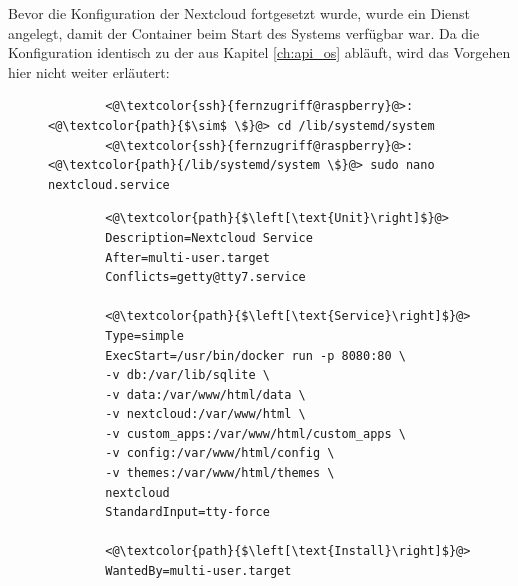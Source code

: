 \documentclass[a4paper, 11pt]{scrartcl}
\begin{document}
Bevor die Konfiguration der Nextcloud fortgesetzt wurde, wurde ein Dienst angelegt, damit der Container beim Start des Systems verfügbar war. Da die Konfiguration
identisch zu der aus Kapitel \ref{ch:api_os} abläuft, wird das Vorgehen hier nicht weiter erläutert:
\begin{figure}[H]
    \begin{mdframed}[backgroundcolor=bbg]
        \begin{lstlisting}
        <@\textcolor{ssh}{fernzugriff@raspberry}@>:<@\textcolor{path}{$\sim$ \$}@> cd /lib/systemd/system
        <@\textcolor{ssh}{fernzugriff@raspberry}@>:<@\textcolor{path}{/lib/systemd/system \$}@> sudo nano nextcloud.service
        \end{lstlisting}
    \end{mdframed}
    \label{lst:create_service_file_nextcloud}
\end{figure}

\begin{figure}[H]
    \begin{mdframed}[backgroundcolor=bbg]
        \begin{lstlisting}
        <@\textcolor{path}{$\left[\text{Unit}\right]$}@>
        Description=Nextcloud Service
        After=multi-user.target
        Conflicts=getty@tty7.service

        <@\textcolor{path}{$\left[\text{Service}\right]$}@>
        Type=simple
        ExecStart=/usr/bin/docker run -p 8080:80 \
        -v db:/var/lib/sqlite \
        -v data:/var/www/html/data \
        -v nextcloud:/var/www/html \
        -v custom_apps:/var/www/html/custom_apps \
        -v config:/var/www/html/config \
        -v themes:/var/www/html/themes \
        nextcloud
        StandardInput=tty-force

        <@\textcolor{path}{$\left[\text{Install}\right]$}@>
        WantedBy=multi-user.target
        \end{lstlisting}
    \end{mdframed}
    \label{lst:service_file}
\end{figure}
\end{document}

